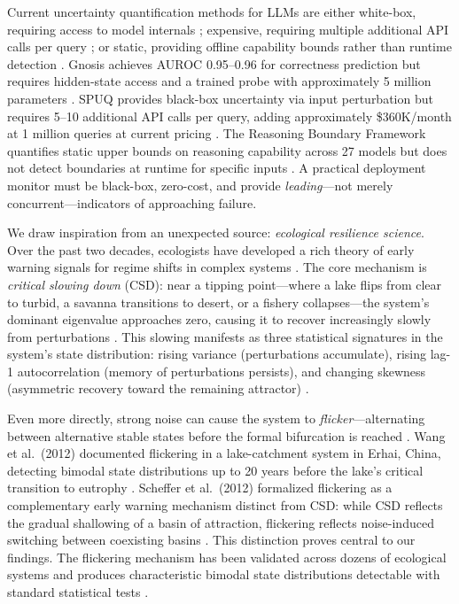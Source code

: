 \documentclass[11pt,letterpaper]{article}
\begin{document}
Current uncertainty quantification methods for LLMs are either white-box, requiring access to model internals \cite{ghasemabadi2025gnosis}; expensive, requiring multiple additional API calls per query \cite{gao2024spuq}; or static, providing offline capability bounds rather than runtime detection \cite{chen2024reasoning}. Gnosis achieves AUROC 0.95--0.96 for correctness prediction but requires hidden-state access and a trained probe with approximately 5 million parameters \cite{ghasemabadi2025gnosis}. SPUQ provides black-box uncertainty via input perturbation but requires 5--10 additional API calls per query, adding approximately \$360K/month at 1 million queries at current pricing \cite{gao2024spuq}. The Reasoning Boundary Framework quantifies static upper bounds on reasoning capability across 27 models but does not detect boundaries at runtime for specific inputs \cite{chen2024reasoning}. A practical deployment monitor must be black-box, zero-cost, and provide \emph{leading}---not merely concurrent---indicators of approaching failure.

We draw inspiration from an unexpected source: \emph{ecological resilience science}. Over the past two decades, ecologists have developed a rich theory of early warning signals for regime shifts in complex systems \cite{scheffer2009, carpenter2006}. The core mechanism is \emph{critical slowing down} (CSD): near a tipping point---where a lake flips from clear to turbid, a savanna transitions to desert, or a fishery collapses---the system's dominant eigenvalue approaches zero, causing it to recover increasingly slowly from perturbations \cite{scheffer2009}. This slowing manifests as three statistical signatures in the system's state distribution: rising variance (perturbations accumulate), rising lag-1 autocorrelation (memory of perturbations persists), and changing skewness (asymmetric recovery toward the remaining attractor) \cite{scheffer2009, dakos2012methods}.

Even more directly, strong noise can cause the system to \emph{flicker}---alternating between alternative stable states before the formal bifurcation is reached \cite{wang2012flickering, scheffer2012}. Wang et al.~(2012) documented flickering in a lake-catchment system in Erhai, China, detecting bimodal state distributions up to 20 years before the lake's critical transition to eutrophy \cite{wang2012flickering}. Scheffer et al.~(2012) formalized flickering as a complementary early warning mechanism distinct from CSD: while CSD reflects the gradual shallowing of a basin of attraction, flickering reflects noise-induced switching between coexisting basins \cite{scheffer2012}. This distinction proves central to our findings. The flickering mechanism has been validated across dozens of ecological systems and produces characteristic bimodal state distributions detectable with standard statistical tests \cite{dakos2013, bury2021}.
\end{document}
